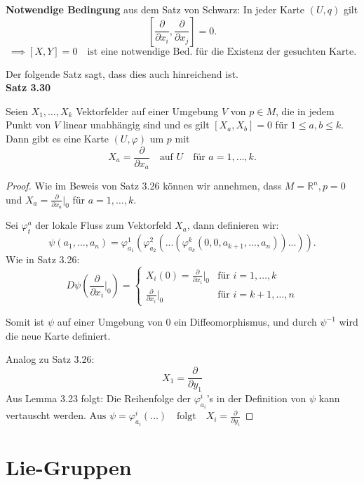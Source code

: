 \documentclass[fleqn, 12pt, letterpaper]{article}
\begin{document}
\vspace{1em}

\textbf{Notwendige Bedingung} aus dem Satz von Schwarz: In jeder Karte $(U, q)$ gilt 
\[
\left[\frac{\partial}{\partial x_i}, \frac{\partial}{\partial x_j}\right] = 0.
\]
\[
\implies [X, Y] = 0 \quad \text{ist eine notwendige Bed. für die Existenz der gesuchten Karte.}
\]

\vspace{1em}

Der folgende Satz sagt, dass dies auch hinreichend ist.\\


\textbf{Satz 3.30}

Seien $X_1, \dots, X_k$ Vektorfelder auf einer Umgebung $V$ von $p \in M$, die in jedem Punkt von $V$ linear unabhängig sind und es gilt $[X_a, X_b] = 0$ für $1 \leq a, b \leq k$. Dann gibt es eine Karte $(U, \varphi)$ um $p$ mit 
\[
X_a = \frac{\partial}{\partial x_a} \quad \text{auf } U \quad \text{für } a = 1, \dots, k.
\]
\begin{proof}
    Wie im Beweis von Satz 3.26 können wir annehmen, dass $M = \mathbb{R}^n, p = 0$ und $X_a = \frac{\partial}{\partial x_a} \big|_0$ für $a = 1, \dots, k$.

\vspace{1em}

Sei $\varphi^a_t$ der lokale Fluss zum Vektorfeld $X_a$, dann definieren wir:
\[
\psi(a_1, \dots, a_n) = \varphi_{a_1}^1 \left( \varphi_{a_2}^2 \left( ...(\varphi_{a_k}^k (0, 0, a_{k+1}, \dots, a_n))... \right) \right).
\]
Wie in Satz 3.26:
\[
D\psi \left(\frac{\partial}{\partial x_i} \big|_0 \right) = 
\begin{cases} 
X_i(0) = \frac{\partial}{\partial x_i} \big|_0  & \text{für } i = 1, \dots, k \\ 
\frac{\partial}{\partial x_i} \big|_0 & \text{für } i = k+1, \dots, n
\end{cases}
\]

Somit ist $\psi$ auf einer Umgebung von $0$ ein Diffeomorphismus, und durch $\psi^{-1}$ wird die neue Karte definiert.

Analog zu Satz 3.26:
\[
X_1 =  \frac{\partial  }{\partial y_1}
\]
Aus Lemma 3.23 folgt: Die Reihenfolge der $\varphi^i_{a_i}$'s in der Definition von $\psi$ kann vertauscht werden.
\(
\text{Aus } \psi = \varphi_{a_i}^i(\dots) \quad \text{folgt} \quad X_i =  \frac{\partial  }{\partial y_i} 
\)
\end{proof}

\section{{Lie-Gruppen}}
\end{document}
